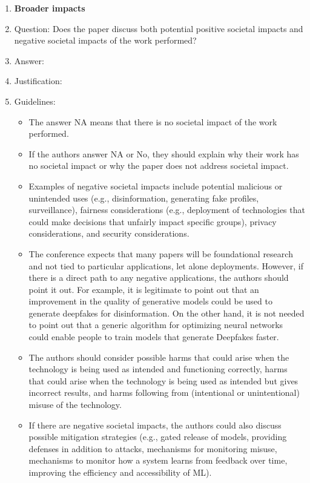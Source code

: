 \documentclass{article}
\theoremstyle{definition} \newtheorem{definition}{Definition}  \newtheorem{example}{Example}
\theoremstyle{remark} \newtheorem{remark}{Remark}
\newcounter{ct}
\begin{document}
\begin{enumerate}
\item {\bf Broader impacts}
    \item[] Question: Does the paper discuss both potential positive societal impacts and negative societal impacts of the work performed?
    \item[] Answer: \answerTODO{} %
    \item[] Justification: \justificationTODO{}
    \item[] Guidelines:
    \begin{itemize}
        \item The answer NA means that there is no societal impact of the work performed.
        \item If the authors answer NA or No, they should explain why their work has no societal impact or why the paper does not address societal impact.
        \item Examples of negative societal impacts include potential malicious or unintended uses (e.g., disinformation, generating fake profiles, surveillance), fairness considerations (e.g., deployment of technologies that could make decisions that unfairly impact specific groups), privacy considerations, and security considerations.
        \item The conference expects that many papers will be foundational research and not tied to particular applications, let alone deployments. However, if there is a direct path to any negative applications, the authors should point it out. For example, it is legitimate to point out that an improvement in the quality of generative models could be used to generate deepfakes for disinformation. On the other hand, it is not needed to point out that a generic algorithm for optimizing neural networks could enable people to train models that generate Deepfakes faster.
        \item The authors should consider possible harms that could arise when the technology is being used as intended and functioning correctly, harms that could arise when the technology is being used as intended but gives incorrect results, and harms following from (intentional or unintentional) misuse of the technology.
        \item If there are negative societal impacts, the authors could also discuss possible mitigation strategies (e.g., gated release of models, providing defenses in addition to attacks, mechanisms for monitoring misuse, mechanisms to monitor how a system learns from feedback over time, improving the efficiency and accessibility of ML).
    \end{itemize}
    

\end{enumerate}
\end{document}
